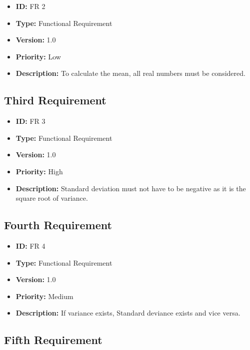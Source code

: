 \documentclass{scrartcl}
\begin{document}
\begin{LARGE}
\begin{itemize}
  \item \textbf{ID:} FR 2 
  \item \textbf{Type:} Functional Requirement 
  \item \textbf{Version:} 1.0
  \item \textbf{Priority:} Low
  \item \textbf{Description:} To calculate the mean, all real numbers must be considered.
\end{itemize}
\end{LARGE}

\subsection{Third Requirement}

\begin{LARGE}
\begin{itemize}
  \item \textbf{ID:} FR 3 
  \item \textbf{Type:} Functional Requirement 
  \item \textbf{Version:} 1.0
  \item \textbf{Priority:} High
  \item \textbf{Description:} Standard deviation must not have to be negative as it is the square root of variance.
\end{itemize}
\end{LARGE}

\subsection{Fourth Requirement}

\begin{LARGE}
\begin{itemize}
  \item \textbf{ID:} FR 4 
  \item \textbf{Type:} Functional Requirement 
  \item \textbf{Version:} 1.0
  \item \textbf{Priority:} Medium 
  \item \textbf{Description:} If variance exists, Standard deviance exists and vice versa.   
\end{itemize}
\end{LARGE}

\subsection{Fifth Requirement}
\end{document}
